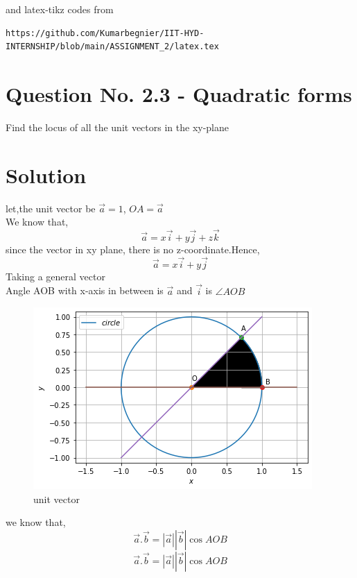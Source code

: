 \documentclass[journal,12pt,twocolumn]{IEEEtran}
\begin{document}
%
and latex-tikz codes from
%
\begin{lstlisting}
https://github.com/Kumarbegnier/IIT-HYD-INTERNSHIP/blob/main/ASSIGNMENT_2/latex.tex
\end{lstlisting}
\section{Question No. 2.3 - Quadratic forms}
Find the locus of all the unit vectors in the
xy-plane%
\section{Solution}
% 
let,the unit vector be $\vec{a}=1$, $OA= \vec{a}$ \\
%
We know that,
%
\begin{equation}
\vec{a} = x\vec{i}+y\vec{j}+z\vec{k}
\end{equation}
%
since the vector in xy plane, there is no z-coordinate.Hence,
%
\begin{equation}
\vec{a} = x\vec{i}+y\vec{j}
\end{equation}
%
Taking a general vector\\
Angle AOB with x-axis in between is  $\vec{a}$ and $\vec{i}$ is $\angle{AOB}$
%
\begin{figure}[!h]
\centering
\includegraphics[width= \columnwidth]{figure2.png}
\caption{unit vector}
\label{Figure}
\end{figure}
%
we know that,
%
\begin{equation}
\vec{a}.\vec{b} = |\vec{a}||\vec{b}|\cos{AOB}
\end{equation}
%
\begin{equation}
\vec{a}.\vec{b} = |\vec{a}||\vec{b}|\cos{AOB}
\end{equation}
\end{document}
